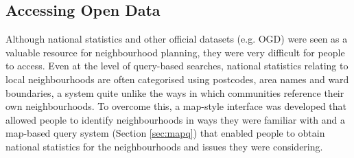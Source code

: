\subsection{Accessing Open Data}
Although national statistics and other official datasets (e.g. OGD) were seen as a valuable resource for neighbourhood planning, they were very difficult for people to access. Even at the level of query-based searches, national statistics relating to local neighbourhoods are often categorised using postcodes, area names and ward boundaries, a system quite unlike the ways in which communities reference their own neighbourhoods. To overcome this, a map-style interface was developed that allowed people to identify neighbourhoods in ways they were familiar with and a map-based query system (Section \ref{sec:mapq}) that enabled people to obtain national statistics for the neighbourhoods and issues they were considering.

